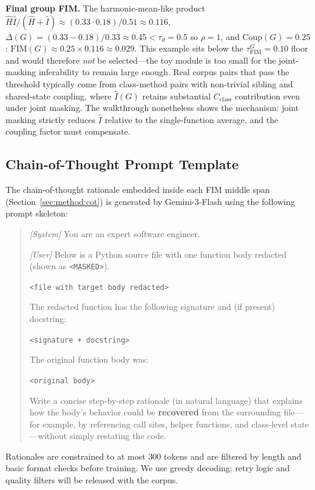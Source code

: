 \textbf{Final group FIM.} The harmonic-mean-like product
$\hat{H}\hat{I}/(\hat{H}+\hat{I})\!\approx\!(0.33\!\cdot\!0.18)/0.51\!\approx\!0.116$,
$\Delta(G)\!=\!(0.33-0.18)/0.33\!\approx\!0.45<\tau_d=0.5$ so
$\rho=1$, and $\mathrm{Coup}(G)=0.25$:
$\mathrm{FIM}(G)\approx 0.25\!\times\!0.116\!\approx\!0.029$. This
example sits below the $\tau^G_{\mathrm{FIM}}\!=\!0.10$ floor and would
therefore \emph{not} be selected---the toy module is too small for the
joint-masking inferability to remain large enough. Real corpus pairs
that pass the threshold typically come from class-method pairs with
non-trivial sibling and shared-state coupling, where $\hat{I}(G)$
retains substantial $C_{\mathrm{class}}$ contribution even under joint
masking. The walkthrough nonetheless shows the mechanism: joint masking
strictly reduces $\hat{I}$ relative to the single-function average,
and the coupling factor must compensate.

\subsection{Chain-of-Thought Prompt Template}
\label{app:algo:cot}

The chain-of-thought rationale embedded inside each FIM middle span
(Section~\ref{sec:method:cot}) is generated by Gemini-3-Flash using
the following prompt skeleton:

\begin{quote}\small
\textit{[System]} You are an expert software engineer.

\noindent\textit{[User]} Below is a Python source file with one function
body redacted (shown as \texttt{<MASKED>}).

\noindent\texttt{<file with target body redacted>}

\noindent The redacted function has the following signature and (if
present) docstring:

\noindent\texttt{<signature + docstring>}

\noindent The original function body was:

\noindent\texttt{<original body>}

\noindent Write a concise step-by-step rationale (in natural language)
that explains how the body's behavior could be \textbf{recovered} from
the surrounding file---for example, by referencing call sites, helper
functions, and class-level state---without simply restating the code.
\end{quote}

Rationales are constrained to at most $300$ tokens and are filtered by
length and basic format checks before training. We use greedy decoding;
retry logic and quality filters will be released with the corpus.

